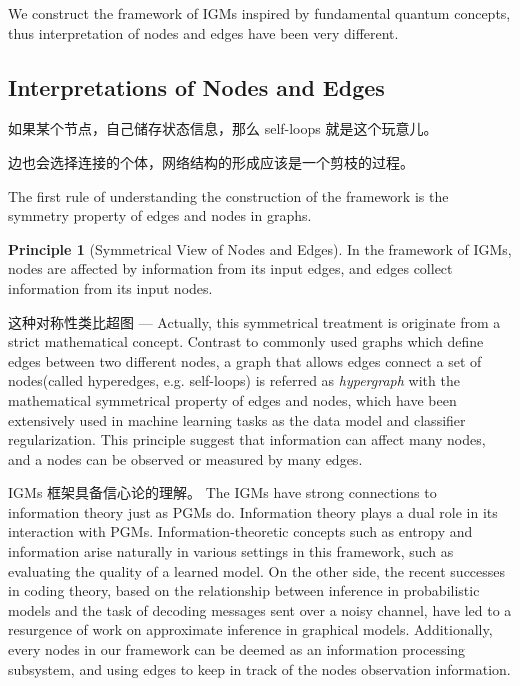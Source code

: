 \documentclass{article}
\theoremstyle{definition}
\theoremstyle{remark}
\theoremstyle{definition}
\newtheorem{principle}[theorem]{Principle}
\begin{document}
\begin{CJK*}{UTF8}{gbsn}
We construct the framework of IGMs inspired by fundamental quantum concepts, thus interpretation of nodes and edges have been very different.

\subsection{Interpretations of Nodes and Edges}

如果某个节点，自己储存状态信息，那么 self-loops 就是这个玩意儿。

边也会选择连接的个体，网络结构的形成应该是一个剪枝的过程。

The first rule of understanding the construction of the framework is the symmetry property of edges and nodes in graphs.

\begin{principle}[Symmetrical View of Nodes and Edges]
\label{prin:sym}
In the framework of IGMs, nodes are affected by information from its input edges, and edges collect information from its input nodes.
\end{principle}

这种对称性类比超图 ---
Actually, this symmetrical treatment is originate from a strict mathematical concept. Contrast to commonly used graphs which define edges between two different nodes, a graph that allows edges connect a set of nodes(called hyperedges, e.g. self-loops) is referred as \emph{hypergraph} with the mathematical symmetrical property of edges and nodes, which have been extensively used in machine learning tasks as the data model and classifier regularization\cite{zhou2007learning}. This principle suggest that information can affect many nodes, and a nodes can be observed or measured by many edges. 

IGMs 框架具备信心论的理解。
The IGMs have strong connections to information theory just as PGMs do. Information theory plays a dual role in its interaction with PGMs. Information-theoretic concepts such as entropy and information arise naturally in various settings in this framework, such as evaluating the quality of a learned model. On the other side, the recent successes in coding theory, based on the relationship between inference in probabilistic models and the task of decoding messages sent over a noisy channel, have led to a resurgence of work on approximate inference in graphical models. Additionally, every nodes in our framework can be deemed as an information processing subsystem, and using edges to keep in track of the nodes observation information. 


\end{CJK*}
\end{document}
